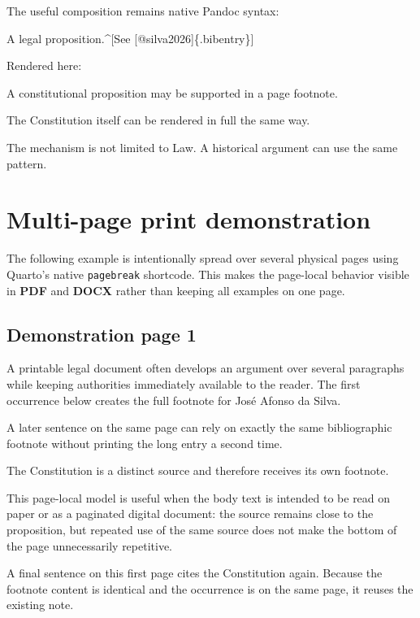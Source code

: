 \documentclass[
  letterpaper,
  DIV=11,
  numbers=noendperiod]{scrartcl}
\newenvironment{Shaded}{\begin{snugshade}}{\end{snugshade}}
\newcommand{\NormalTok}[1]{\textcolor[rgb]{0.00,0.23,0.31}{#1}}
\begin{document}
The useful composition remains native Pandoc syntax:

\begin{Shaded}
\begin{Highlighting}[]
\NormalTok{A legal proposition.\^{}[See [@silva2026]\{.bibentry\}]}
\end{Highlighting}
\end{Shaded}

Rendered here:

A constitutional proposition may be supported in a page
footnote.\rfnnotea

The Constitution itself can be rendered in full the same way.\rfnnoteb

The mechanism is not limited to Law. A historical argument can use the
same pattern.\rfnnotec

\section{Multi-page print
demonstration}\label{multi-page-print-demonstration}

The following example is intentionally spread over several physical
pages using Quarto's native \texttt{pagebreak} shortcode. This makes the
page-local behavior visible in \textbf{PDF} and \textbf{DOCX} rather
than keeping all examples on one page.

\subsection{Demonstration page 1}\label{demonstration-page-1}

A printable legal document often develops an argument over several
paragraphs while keeping authorities immediately available to the
reader. The first occurrence below creates the full footnote for José
Afonso da Silva.\rfnnotea

A later sentence on the same page can rely on exactly the same
bibliographic footnote without printing the long entry a second
time.\rfnnotea

The Constitution is a distinct source and therefore receives its own
footnote.\rfnnoteb

This page-local model is useful when the body text is intended to be
read on paper or as a paginated digital document: the source remains
close to the proposition, but repeated use of the same source does not
make the bottom of the page unnecessarily repetitive.

A final sentence on this first page cites the Constitution again.
Because the footnote content is identical and the occurrence is on the
same page, it reuses the existing note.\rfnnoteb
\end{document}
